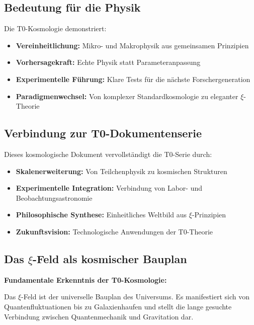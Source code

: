 \documentclass[12pt,a4paper]{article}
\begin{document}
	\subsection{Bedeutung für die Physik}
	
	Die T0-Kosmologie demonstriert:
	
	\begin{itemize}
		\item \textbf{Vereinheitlichung:} Mikro- und Makrophysik aus gemeinsamen Prinzipien
		\item \textbf{Vorhersagekraft:} Echte Physik statt Parameteranpassung
		\item \textbf{Experimentelle Führung:} Klare Tests für die nächste Forschergeneration
		\item \textbf{Paradigmenwechsel:} Von komplexer Standardkosmologie zu eleganter $\xi$-Theorie
	\end{itemize}
	
	\subsection{Verbindung zur T0-Dokumentenserie}
	
	Dieses kosmologische Dokument vervollständigt die T0-Serie durch:
	
	\begin{itemize}
		\item \textbf{Skalenerweiterung:} Von Teilchenphysik zu kosmischen Strukturen
		\item \textbf{Experimentelle Integration:} Verbindung von Labor- und Beobachtungsastronomie
		\item \textbf{Philosophische Synthese:} Einheitliches Weltbild aus $\xi$-Prinzipien
		\item \textbf{Zukunftsvision:} Technologische Anwendungen der T0-Theorie
	\end{itemize}
	
	\subsection{Das $\xi$-Feld als kosmischer Bauplan}
	
	\begin{revolutionary}
		\textbf{Fundamentale Erkenntnis der T0-Kosmologie:}
		
		Das $\xi$-Feld ist der universelle Bauplan des Universums. Es manifestiert sich von Quantenfluktuationen bis zu Galaxienhaufen und stellt die lange gesuchte Verbindung zwischen Quantenmechanik und Gravitation dar.
	\end{revolutionary}
	
\end{document}
